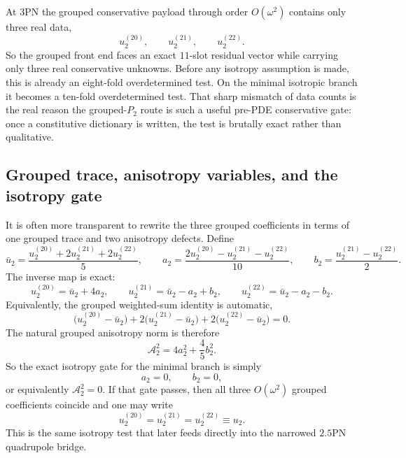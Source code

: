 \documentclass[11pt]{article}
\begin{document}
At $3$PN the grouped conservative payload through order \(O(\omega^2)\) contains
only three real data,
\begin{equation}
 u_2^{(20)},\qquad u_2^{(21)},\qquad u_2^{(22)}.
\label{eq:app-grouped-p2-target-pack-u2-data}
\end{equation}
So the grouped front end faces an exact $11$-slot residual vector while carrying
only three real conservative unknowns.  Before any isotropy assumption is made,
this is already an eight-fold overdetermined test.  On the minimal isotropic
branch it becomes a ten-fold overdetermined test.  That sharp mismatch of data
counts is the real reason the grouped-$P_2$ route is such a useful pre-PDE
conservative gate: once a constitutive dictionary is written, the test is
brutally exact rather than qualitative.

\subsection{Grouped trace, anisotropy variables, and the isotropy gate}
\label{app:grouped-p2-target-pack-trace}

It is often more transparent to rewrite the three grouped coefficients in terms
of one grouped trace and two anisotropy defects.  Define
\begin{equation}
 \bar u_2=\frac{u_2^{(20)}+2u_2^{(21)}+2u_2^{(22)}}{5},
 \qquad
 a_2=\frac{2u_2^{(20)}-u_2^{(21)}-u_2^{(22)}}{10},
 \qquad
 b_2=\frac{u_2^{(21)}-u_2^{(22)}}{2}.
\label{eq:app-grouped-p2-target-pack-trace-defects}
\end{equation}
The inverse map is exact:
\begin{equation}
 u_2^{(20)}=\bar u_2+4a_2,
 \qquad
 u_2^{(21)}=\bar u_2-a_2+b_2,
 \qquad
 u_2^{(22)}=\bar u_2-a_2-b_2.
\label{eq:app-grouped-p2-target-pack-inverse}
\end{equation}
Equivalently, the grouped weighted-sum identity is automatic,
\begin{equation}
 \bigl(u_2^{(20)}-\bar u_2\bigr)
 +2\bigl(u_2^{(21)}-\bar u_2\bigr)
 +2\bigl(u_2^{(22)}-\bar u_2\bigr)=0.
\label{eq:app-grouped-p2-target-pack-weighted-sum}
\end{equation}
The natural grouped anisotropy norm is therefore
\begin{equation}
 \mathcal A_2^2=4a_2^2+\frac{4}{5}b_2^2.
\label{eq:app-grouped-p2-target-pack-anisotropy}
\end{equation}
So the exact isotropy gate for the minimal branch is simply
\begin{equation}
 \boxed{a_2=0,
 \qquad
 b_2=0,}
\label{eq:app-grouped-p2-target-pack-isotropy}
\end{equation}
or equivalently \(\mathcal A_2^2=0\).  If that gate passes, then all three
$O(\omega^2)$ grouped coefficients coincide and one may write
\begin{equation}
 u_2^{(20)}=u_2^{(21)}=u_2^{(22)}\equiv u_2.
\label{eq:app-grouped-p2-target-pack-isotropic-u2}
\end{equation}
This is the same isotropy test that later feeds directly into the narrowed
$2.5$PN quadrupole bridge.
\end{document}
